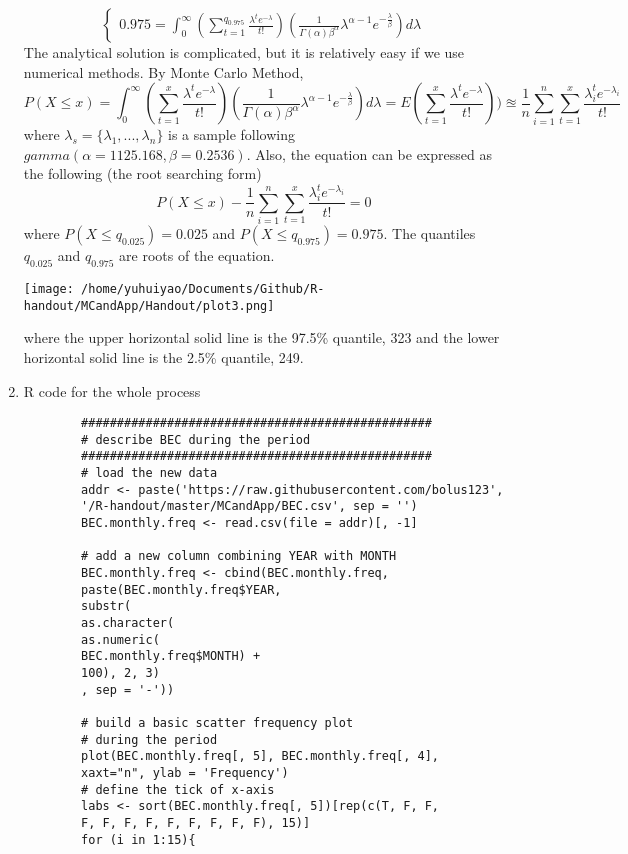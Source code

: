 \begin{enumerate}
\begin{equation*}
\begin{cases}
		0.975 = \int_{0}^{\infty}(\sum_{t = 1}^{q_{0.975}}\frac{\lambda^{t}e^{-\lambda}}{t!})(\frac{1}{\Gamma(\alpha)\beta^{\alpha}}\lambda^{\alpha - 1}e^{-\frac{\lambda}{\beta}}) d \lambda
		\end{cases}
	\end{equation*}
	The analytical solution is complicated, but it is relatively easy if we use numerical methods. By Monte Carlo Method,
	\begin{equation*}
		P(X \le x) = \int_{0}^{\infty}(\sum_{t = 1}^{x}\frac{\lambda^{t}e^{-\lambda}}{t!})(\frac{1}{\Gamma(\alpha)\beta^{\alpha}}\lambda^{\alpha - 1}e^{-\frac{\lambda}{\beta}}) d \lambda = E(\sum_{t = 1}^{x}\frac{\lambda^{t}e^{-\lambda}}{t!})) \approxeq \frac{1}{n} \sum_{i = 1}^{n} \sum_{t = 1}^{x}\frac{\lambda_i^{t}e^{-\lambda_i}}{t!}
	\end{equation*}
	where $\lambda_s = \{\lambda_1,...,\lambda_n \}$ is a sample following $gamma(\alpha= 1125.168, \beta = 0.2536)$. Also, the equation can be expressed as the following (the root searching form)
	\begin{equation*}
		P(X \le x) - \frac{1}{n} \sum_{i = 1}^{n} \sum_{t = 1}^{x}\frac{\lambda_i^{t}e^{-\lambda_i}}{t!} = 0
	\end{equation*}
	where $P(X \le q_{0.025}) = 0.025$ and $P(X \le  q_{0.975}) = 0.975$. The quantiles $q_{0.025}$ and $q_{0.975}$ are roots of the equation. 
	\begin{center}
		\texttt{[image: /home/yuhuiyao/Documents/Github/R-handout/MCandApp/Handout/plot3.png]}
	\end{center}
	where the upper horizontal solid line is the 97.5\% quantile, 323 and the lower horizontal solid line is the 2.5\% quantile, 249.
	\item R code for the whole process
	\begin{verbatim}
		#################################################
		# describe BEC during the period
		#################################################
		# load the new data
		addr <- paste('https://raw.githubusercontent.com/bolus123', 
		'/R-handout/master/MCandApp/BEC.csv', sep = '')
		BEC.monthly.freq <- read.csv(file = addr)[, -1]
		
		# add a new column combining YEAR with MONTH
		BEC.monthly.freq <- cbind(BEC.monthly.freq, 
		paste(BEC.monthly.freq$YEAR, 
		substr(
		as.character(
		as.numeric(
		BEC.monthly.freq$MONTH) + 
		100), 2, 3)
		, sep = '-'))
		
		# build a basic scatter frequency plot 
		# during the period
		plot(BEC.monthly.freq[, 5], BEC.monthly.freq[, 4], 
		xaxt="n", ylab = 'Frequency')
		# define the tick of x-axis
		labs <- sort(BEC.monthly.freq[, 5])[rep(c(T, F, F, 
		F, F, F, F, F, F, F, F, F), 15)]
		for (i in 1:15){
		

\end{verbatim}
\end{enumerate}
